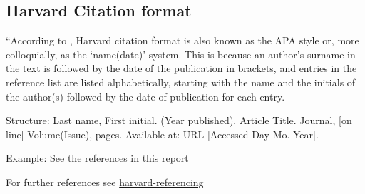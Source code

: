 
\subsection{Harvard Citation format}

“According to \cite{James2008}, Harvard citation format is also known as the APA style or, more colloquially, as the ‘name(date)’ system. This is because an author’s surname in the text is followed by the date of the publication in brackets, and entries in the reference list are listed alphabetically, starting with the name and the initials of the author(s) followed by the date of publication for each entry.

Structure: Last name, First initial. (Year published). Article Title. Journal, [on line] Volume(Issue), pages. Available at: URL [Accessed Day Mo. Year].

Example: See the references in this report

For further references see \href{http://www.citethisforme.com/harvard-referencing}{harvard-referencing}
